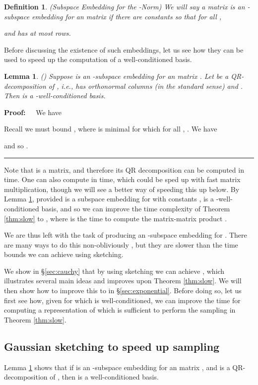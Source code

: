 \documentclass[11pt]{article}
\newtheorem{lemma}[theorem]{Lemma}
\newtheorem{definition}[theorem]{Definition}
\newenvironment{proof}{\begin{trivlist} \item {\bf Proof:~~}}
  {\qed\end{trivlist}}
\def\qed{\hfill\rule{2mm}{2mm}}
\begin{document}
\begin{definition}(Subspace Embedding for the -Norm)
We will say a matrix  is an -subspace embedding for an  matrix 
 if there are constants  so that for all ,

and  has at most  rows. 
\end{definition}
Before discussing the existence of such embeddings, let us see how they can be used to speed up the computation of a well-conditioned basis.
\begin{lemma}\label{lem:wcbse}(\cite{sw11})
Suppose  is an -subspace embedding for an  matrix . Let  
be a QR-decomposition of , i.e.,  has orthonormal
columns (in the standard  sense) and . Then  
is a -well-conditioned basis.
\end{lemma}
\begin{proof}
We have 

Recall we must bound , where  is minimal for which for all ,
. We have

and so . 
\end{proof}
Note that  is a  matrix, and therefore its QR decomposition can be computed in  time. One can also
compute  in  time, which could be sped up with fast matrix multiplication, though we will see a better way
of speeding this up below. By Lemma \ref{lem:wcbse}, provided  is a subspace embedding for  with constants , 
is a -well-conditioned basis, and so we can improve
the time complexity of Theorem \ref{thm:slow} to , 
where  is the time to compute the matrix-matrix
product . 

We are thus left with the task of producing an -subspace embedding for . 
There are many ways to do this non-obliviously \cite{l78,s87,blm89,t90,js03}, 
but they are slower than the time bounds we can achieve using
sketching. 

We show in \S\ref{sec:cauchy} that by using sketching we can achieve 
, which illustrates several main ideas and improves upon Theorem \ref{thm:slow}. 
We will then show how to improve
this to  in \S\ref{sec:exponential}. 
Before doing so, let us first see how, given  for which 
is well-conditioned, we can 
improve the  time for computing a representation of 
 which is sufficient to perform the sampling in Theorem \ref{thm:slow}. 

\subsection{Gaussian sketching to speed up sampling}\label{sec:gaussian}
Lemma \ref{lem:wcbse} shows that if  is an -subspace embedding for an  matrix , 
and  is a QR-decomposition of , then  is a well-conditioned basis.
\end{document}
